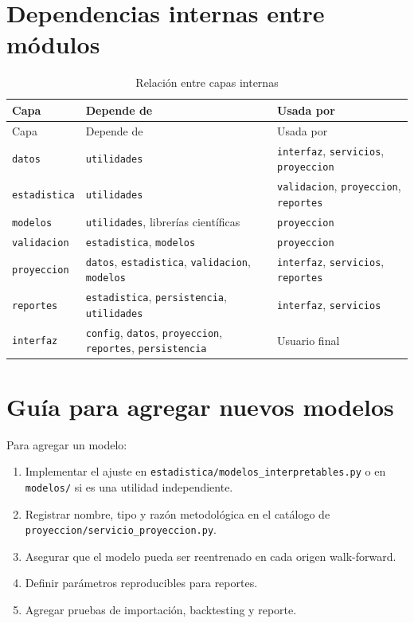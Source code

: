 \documentclass[12pt,letterpaper]{article}
\begin{document}
\section{Dependencias internas entre módulos}

\begin{longtable}{p{}p{}p{}}
\caption{Relación entre capas internas}
\label{tab:dependencias_internas}\\
\toprule
Capa & Depende de & Usada por \\
\midrule
\endfirsthead
\toprule
Capa & Depende de & Usada por \\
\midrule
\endhead
\texttt{datos} & \texttt{utilidades} & \texttt{interfaz}, \texttt{servicios}, \texttt{proyeccion} \\
\texttt{estadistica} & \texttt{utilidades} & \texttt{validacion}, \texttt{proyeccion}, \texttt{reportes} \\
\texttt{modelos} & \texttt{utilidades}, librerías científicas & \texttt{proyeccion} \\
\texttt{validacion} & \texttt{estadistica}, \texttt{modelos} & \texttt{proyeccion} \\
\texttt{proyeccion} & \texttt{datos}, \texttt{estadistica}, \texttt{validacion}, \texttt{modelos} & \texttt{interfaz}, \texttt{servicios}, \texttt{reportes} \\
\texttt{reportes} & \texttt{estadistica}, \texttt{persistencia}, \texttt{utilidades} & \texttt{interfaz}, \texttt{servicios} \\
\texttt{interfaz} & \texttt{config}, \texttt{datos}, \texttt{proyeccion}, \texttt{reportes}, \texttt{persistencia} & Usuario final \\
\bottomrule
\end{longtable}

\section{Guía para agregar nuevos modelos}

Para agregar un modelo:

\begin{enumerate}[leftmargin=*]
    \item Implementar el ajuste en \texttt{estadistica/modelos\_interpretables.py} o en \texttt{modelos/} si es una utilidad independiente.
    \item Registrar nombre, tipo y razón metodológica en el catálogo de \texttt{proyeccion/servicio\_proyeccion.py}.
    \item Asegurar que el modelo pueda ser reentrenado en cada origen walk-forward.
    \item Definir parámetros reproducibles para reportes.
    \item Agregar pruebas de importación, backtesting y reporte.
\end{enumerate}
\end{document}
